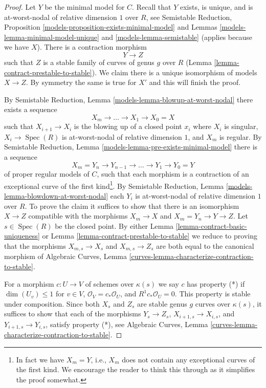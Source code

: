 \documentclass[10pt,a4paper]{amsart}
\theoremstyle{plain}
\theoremstyle{definition}
\theoremstyle{remark}
\numberwithin{equation}{subsection}
\def\Spec{\mathop{\mathrm{Spec}}}
\begin{document}
\begin{proof}
Let $Y$ be the minimal model for $C$. Recall that $Y$ exists, is
unique, and is at-worst-nodal of relative dimension $1$ over $R$, see
Semistable Reduction,
Proposition \ref{models-proposition-exists-minimal-model} and
Lemmas \ref{models-lemma-minimal-model-unique} and
\ref{models-lemma-semistable} (applies because we have $X$).
There is a contraction morphism
$$
Y \longrightarrow Z
$$
such that $Z$ is a stable family of curves of genus $g$ over $R$
(Lemma \ref{lemma-contract-prestable-to-stable}). We claim
there is a unique isomorphism of models $X \to Z$.
By symmetry the same is true for $X'$ and this will finish the proof.

\medskip\noindent
By Semistable Reduction, Lemma \ref{models-lemma-blowup-at-worst-nodal}
there exists a sequence
$$
X_m \to \ldots \to X_1 \to X_0 = X
$$
such that $X_{i + 1} \to X_i$ is the blowing up of a closed point
$x_i$ where $X_i$ is singular, $X_i \to \Spec(R)$ is at-worst-nodal
of relative dimension $1$, and $X_m$ is regular.
By Semistable Reduction, Lemma \ref{models-lemma-pre-exists-minimal-model}
there is a sequence
$$
X_m = Y_n \to Y_{n - 1} \to \ldots \to Y_1 \to Y_0 = Y
$$
of proper regular models of $C$, such that each morphism is a
contraction of an exceptional curve of the first kind\footnote{In fact
we have $X_m = Y$, i.e., $X_m$ does not contain any exceptional curves
of the first kind. We encourage the reader to think this through
as it simplifies the proof somewhat.}.
By Semistable Reduction, Lemma \ref{models-lemma-blowdown-at-worst-nodal}
each $Y_i$ is at-worst-nodal of relative dimension $1$ over $R$.
To prove the claim it suffices to show that there is an isomorphism
$X \to Z$ compatible with the morphisms $X_m \to X$
and $X_m = Y_n \to Y \to Z$. Let $s \in \Spec(R)$ be the closed point.
By either
Lemma \ref{lemma-contract-basic-uniqueness} or
Lemma \ref{lemma-contract-prestable-to-stable}
we reduce to proving that the morphisms
$X_{m, s} \to X_s$ and
$X_{m, s} \to Z_s$
are both equal to the canonical morphism of
Algebraic Curves, Lemma \ref{curves-lemma-characterize-contraction-to-stable}.

\medskip\noindent
For a morphism $c : U \to V$ of schemes over $\kappa(s)$
we say $c$ has property (*) if $\dim(U_v) \leq 1$ for $v \in V$,
$\mathcal{O}_V = c_*\mathcal{O}_U$, and $R^1c_*\mathcal{O}_U = 0$.
This property is stable under composition.
Since both $X_s$ and $Z_s$ are stable genus $g$ curves over $\kappa(s)$,
it suffices to show that each of the morphisms $Y_s \to Z_s$,
$X_{i + 1, s} \to X_{i, s}$, and $Y_{i + 1, s} \to Y_{i, s}$,
satisfy property (*), see
Algebraic Curves, Lemma \ref{curves-lemma-characterize-contraction-to-stable}.


\end{proof}
\end{document}
